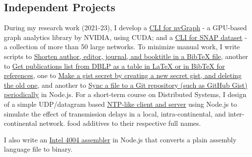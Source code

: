 \subsection{Independent Projects}

During my research work (2021-23), I develop a \href{https://github.com/nodef/nvgraph.sh}{CLI for nvGraph} - a GPU-based graph analytics library by NVIDIA, using CUDA; and a \href{https://github.com/nodef/snap-data.sh}{CLI for SNAP dataset} - a collection of more than 50 large networks. To minimize manual work, I write scripts to \href{https://github.com/javascriptf/script-minify-bibtex}{Shorten author, editor, journal, and booktitle in a BibTeX file}, another to \href{https://github.com/javascriptf/script-publications-list}{Get publications list from DBLP as a table in LaTeX or in BibTeX for references}, one to \href{https://github.com/javascriptf/script-gist-conceal}{Make a gist secret by creating a new secret gist, and deleting the old one}, and another to \href{https://github.com/javascriptf/script-git-sync-file}{Sync a file to a Git repository (such as GitHub Gist) periodically} in Node.js. For a short-term course on Distributed Systems, I design of a simple UDP/datagram based \href{https://github.com/javascriptf/nodejs-time-server}{NTP-like client and server} using Node.js to simulate the effect of transmission delays in a local, intra-continental, and inter-continental network.
food additives to their respective full names.I also write an \href{https://github.com/javascriptf/nodejs-4004-assembler}{Intel 4004 assembler} in Node.js that converts a plain assembly language file to binary.

